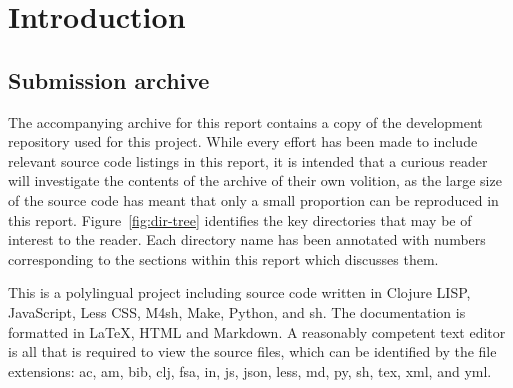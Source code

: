 \chapter{Introduction}\label{chap:introduction}







\newpage
\section*{Submission archive}
The accompanying archive for this report contains a copy of the
development repository used for this project. While every effort has
been made to include relevant source code listings in this report, it
is intended that a curious reader will investigate the contents of the
archive of their own volition, as the large size of the source code
has meant that only a small proportion can be reproduced in this
report. Figure~\ref{fig:dir-tree} identifies the key directories that
may be of interest to the reader. Each directory name has been
annotated with numbers corresponding to the sections within this
report which discusses them.

This is a polylingual project including source code written in Clojure
LISP, JavaScript, Less CSS, M4sh, Make, Python, and sh. The
documentation is formatted in \LaTeX, HTML and Markdown. A reasonably
competent text editor is all that is required to view the source
files, which can be identified by the file extensions: ac, am, bib,
clj, fsa, in, js, json, less, md, py, sh, tex, xml, and yml.


